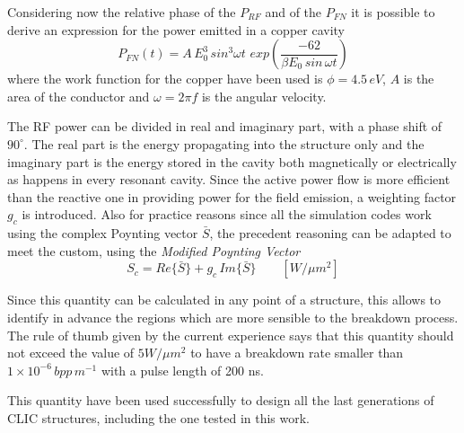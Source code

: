 Considering now the relative phase of the $P_{RF}$ and of the $P_{FN}$ it is possible to derive an expression for the power emitted in a copper cavity
\begin{equation}
P_{FN} (t) = A \, E^3_0 \, sin^3 \omega t \,  \, exp \left ( \frac{-62}{\beta E_0 \, sin \, \omega t} \right )
\end{equation}
where the work function for the copper have been used is $\phi = 4.5 \, eV$, $A$ is the area of the conductor and $\omega = 2 \pi f$ is the angular velocity.

The RF power can be divided in real and imaginary part, with a phase shift of $90^\circ$. The real part is the energy propagating into the structure only and the imaginary part is the energy stored in the cavity both magnetically or electrically as happens in every resonant cavity. Since the active power flow is more efficient than the reactive one in providing power for the field emission, a weighting factor $g_c$ is introduced. Also for practice reasons since all the simulation codes work using the complex Poynting vector $\bar{S}$, the precedent reasoning can be adapted to meet the custom, using the \textit{Modified Poynting Vector}
\begin{equation}
S_c = Re\{ \bar{S} \} + g_c \, Im \{ \bar{S} \} \qquad [W/\mu m^2]
\end{equation} 

Since this quantity can be calculated in any point of a structure, this allows to identify in advance the regions which are more sensible to the breakdown process. The rule of thumb given by the current experience says that this quantity should not exceed the value of $5 W/\mu m^2$ to have a breakdown rate smaller than $1\times 10^{-6} \, bpp \, m^{-1}$ with a pulse length of 200 ns.

This quantity have been used successfully to design all the last generations of CLIC structures, including the one tested in this work.


